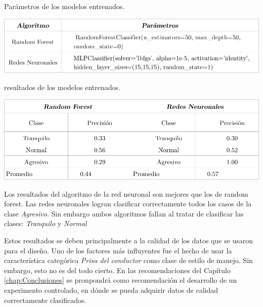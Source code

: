 \begin{table}[htb!]
\centering
\caption{Parámetros de los modelos entrenados.}
\includegraphics[width=\textwidth]{param_modelo.pdf}
\label{diag:param_modelos}
\end{table}


\begin{table}[htb!]
\centering
\caption{resultados de los modelos entrenados.}
\includegraphics[width=\textwidth]{results_modelo.pdf}
\label{diag:results_modelos}
\end{table}

Los resultados del algoritmo de la red neuronal son mejores que los de random forest. Las redes neuronales logran clasificar correctamente todos los casos de la clase \textit{Agresivo}. Sin embargo ambos algoritmos fallan al tratar de clasificar las clases: \textit{Tranquilo} y \textit{Normal}

Estos resultados se deben principalmente a la calidad de los datos que se usaron para el diseño. Uno de los factores más influyentes fue el hecho de usar la característica categórica \textit{Prisa del conductor} como clase  de estilo de manejo. Sin embargo, esto no es del todo cierto. En las recomendaciones del Capítulo \ref{chap:Conclusiones} se pronpondrá como recomendación el desarrollo de un experimento controlado, en dónde se pueda adquirir datos de calidad correctamente clasificados.

